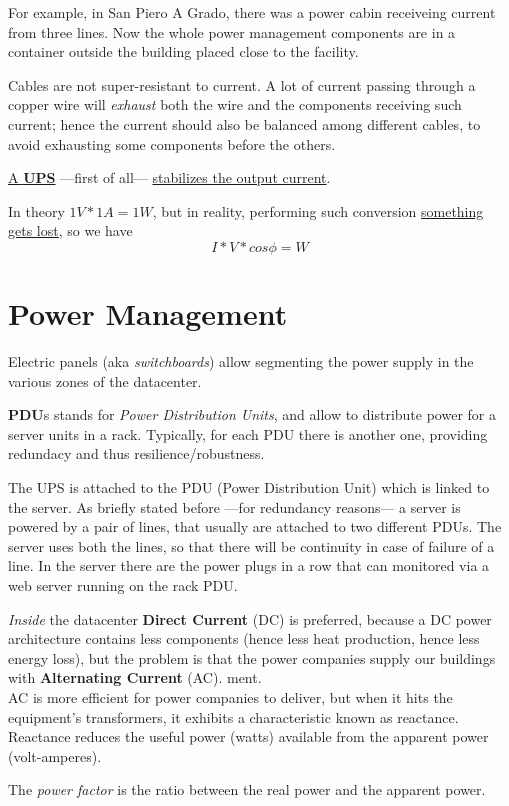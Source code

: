 For example, in San Piero A Grado, there was a power cabin receiveing current from three lines.
Now the whole power management components are in a container outside the building placed close to the facility.

Cables are not super-resistant to current. A lot of current passing through a copper wire will \textit{exhaust} both the wire and the components receiving such current;
hence the current should also be balanced among different cables, to avoid exhausting some components before the others.


\ul{A \textbf{UPS}} ---first of all--- \ul{stabilizes the output current}.

In theory $1V * 1A = 1W$, but in reality, performing such conversion \ul{something gets lost}, so we have
\[I * V * cos \phi = W\]

\section{Power Management}

Electric panels (aka \textit{switchboards}) allow segmenting the power supply in the various zones of the datacenter.

\textbf{PDU}s stands for \textit{Power Distribution Units}, and allow to distribute power for a server units in a rack.
Typically, for each PDU there is another one, providing redundacy and thus resilience/robustness.

The UPS is attached to the PDU (Power Distribution Unit) which is linked to the server.
As briefly stated before ---for redundancy reasons--- a server is powered by a pair of lines, that usually are attached to two different PDUs. The server uses both the lines, so that there will be continuity in case of failure of a line. 
In the server there are the power plugs in a row that can monitored via a web server running on the rack PDU.

\nl

\textit{Inside} the datacenter \textbf{Direct Current} (DC) is preferred, because a DC power architecture contains less components (hence less heat production, hence less energy loss), but the problem is that the power companies supply our buildings with \textbf{Alternating Current} (AC).
ment.\\
AC is more efficient for power companies to deliver, but when it hits the equipment’s transformers, it exhibits a characteristic known as reactance.
Reactance reduces the useful power (watts) available from the apparent power (volt-amperes).
\begin{definition}
The \textit{power factor} is the ratio between the real power and the apparent power.
\end{definition}

